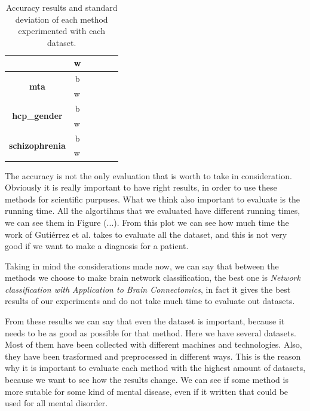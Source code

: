 \begin{table}
{\begin{tabular}{c|c|c|c|c|c}
	\cline{2-6}
	& \multicolumn{1}{l|}{w} & \multicolumn{1}{l|}{}        & \multicolumn{1}{l|}{} & \multicolumn{1}{l|}{} & \multicolumn{1}{l}{}  \\ 
	\midrule
	\multirow{2}{*}{\textbf{mta}}           & b                      &                              &                       &                       &                       \\ 
	\cline{2-6}
	& \multicolumn{1}{l|}{w} & \multicolumn{1}{l|}{}        & \multicolumn{1}{l|}{} & \multicolumn{1}{l|}{} & \multicolumn{1}{l}{}  \\ 
	\midrule
	\multirow{2}{*}{\textbf{hcp\_gender}}   & b                      &                              &                       &                       &                       \\ 
	\cline{2-6}
	& \multicolumn{1}{l|}{w} & \multicolumn{1}{l|}{}        & \multicolumn{1}{l|}{} & \multicolumn{1}{l|}{} & \multicolumn{1}{l}{}  \\ 
	\midrule
	\multirow{2}{*}{\textbf{schizophrenia}} & b                      &                              &                       &                       &                       \\ 
	\cline{2-6}
	& \multicolumn{1}{l|}{w} & \multicolumn{1}{l|}{}        & \multicolumn{1}{l|}{} & \multicolumn{1}{l|}{} & \multicolumn{1}{l}{}  \\
	\bottomrule
\end{tabular}
}
\caption{Accuracy results and standard deviation of each method experimented with each dataset.}
\label{tab:all_results}
\end{table}

The accuracy is not the only evaluation that is worth to take in consideration. Obviously it is really important to have right results, in order to use these methods for scientific purpuses. What we think also important to evaluate is the running time. All the algortihms that we evaluated have different running times, we can see them in Figure (...). From this plot we can see how much time the work of Guti\'{e}rrez et al. \cite{GutierrezBio} takes to evaluate all the dataset, and this is not very good if we want to make a diagnosis for a patient. 
\vspace{0.5cm}

Taking in mind the considerations made now, we can say that between the methods we choose to make brain network classification, the best one is \textit{Network classification with Application to Brain Connectomics}, in fact it gives the best results of our experiments and do not take much time to evaluate out datasets.

From these results we can say that even the dataset is important, because it needs to be as good as possible for that method. Here we have several datasets. Most of them have been collected with different machines and technologies. Also, they have been trasformed and preprocessed in different ways. This is the reason why it is important to evaluate each method with the highest amount of datasets, because we want to see how the results change. We can see if some method is more sutable for some kind of mental disease, even if it written that could be used for all mental disorder.
